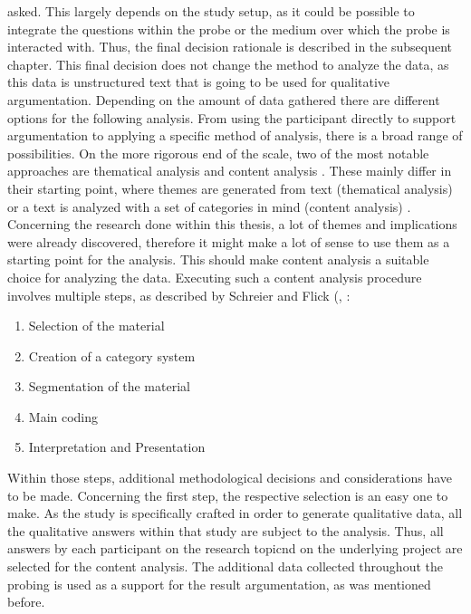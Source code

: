 asked. This largely depends on the study setup, as it could be possible to integrate the questions within the probe or the medium over which the probe is interacted with. Thus, the final decision rationale is described in the subsequent chapter. This final decision does not change the method to analyze the data, as this data is unstructured text that is going to be used for qualitative argumentation. Depending on the amount of data gathered there are different options for the following analysis. From using the participant directly to support argumentation to applying a specific method of analysis, there is a broad range of possibilities. On the more rigorous end of the scale, two of the most notable approaches are thematical analysis \cite{braun2006using} and content analysis \cite{schreier2012qualitative}. These mainly differ in their starting point, where themes are generated from text (thematical analysis) or a text is analyzed with a set of categories in mind (content analysis) \cite[p. 490]{flick2018introduction}. Concerning the research done within this thesis, a lot of themes and implications were already discovered, therefore it might make a lot of sense to use them as a starting point for the analysis. This should make content analysis a suitable choice for analyzing the data. Executing such a content analysis procedure involves multiple steps, as described by Schreier and Flick (\cite[p. 174]{schreier2014ways}, \cite[p. 483-485]{flick2018introduction}:

\begin{enumerate}
  \item{Selection of the material}
  \item{Creation of a category system}
  \item{Segmentation of the material}
  \item{Main coding}
  \item{Interpretation and Presentation}
\end{enumerate}

Within those steps, additional methodological decisions and considerations have to be made. Concerning the first step, the respective selection is an easy one to make. As the study is specifically crafted in order to generate qualitative data, all the qualitative answers within that study are subject to the analysis. Thus, all answers by each participant on the research topicnd on the underlying project are selected for the content analysis. The additional data collected throughout the probing is used as a support for the result argumentation, as was mentioned before.

